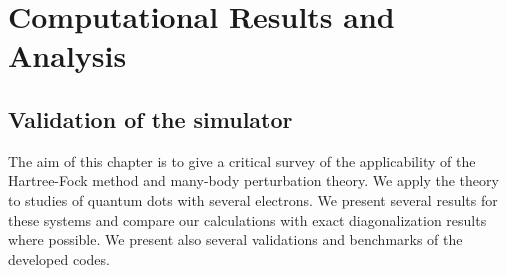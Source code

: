 \chapter{Computational Results and Analysis}
\label{analysis}




\section{Validation of the simulator}
\label{sec:validationSimu}
The aim of this chapter is to give a critical survey of the applicability of the Hartree-Fock method and many-body perturbation theory.
We apply the theory to studies of quantum dots with several electrons. 
We present several results for these systems and compare our calculations with exact diagonalization results where possible.  
We present also several validations and 
benchmarks of the developed codes. 

